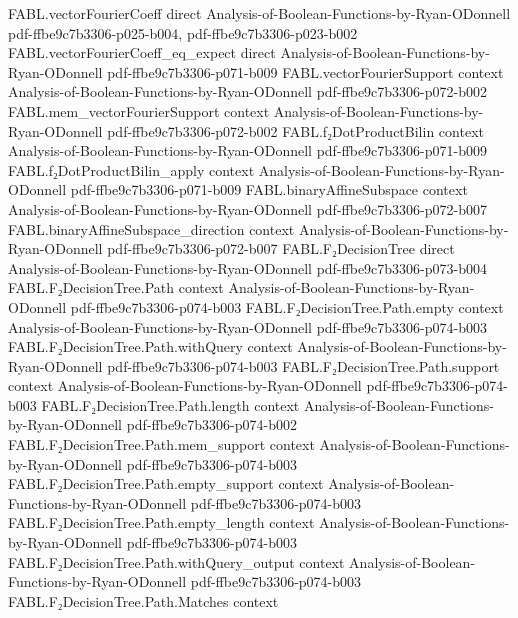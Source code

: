 \begin{theorem}
\proofstep
  {FABL.vectorFourierCoeff}
  {direct}
  {Analysis-of-Boolean-Functions-by-Ryan-ODonnell}
  {pdf-ffbe9c7b3306-p025-b004,
    pdf-ffbe9c7b3306-p023-b002}
\proofstep
  {FABL.vectorFourierCoeff_eq_expect}
  {direct}
  {Analysis-of-Boolean-Functions-by-Ryan-ODonnell}
  {pdf-ffbe9c7b3306-p071-b009}
\proofstep
  {FABL.vectorFourierSupport}
  {context}
  {Analysis-of-Boolean-Functions-by-Ryan-ODonnell}
  {pdf-ffbe9c7b3306-p072-b002}
\proofstep
  {FABL.mem_vectorFourierSupport}
  {context}
  {Analysis-of-Boolean-Functions-by-Ryan-ODonnell}
  {pdf-ffbe9c7b3306-p072-b002}
\proofstep
  {FABL.f₂DotProductBilin}
  {context}
  {Analysis-of-Boolean-Functions-by-Ryan-ODonnell}
  {pdf-ffbe9c7b3306-p071-b009}
\proofstep
  {FABL.f₂DotProductBilin_apply}
  {context}
  {Analysis-of-Boolean-Functions-by-Ryan-ODonnell}
  {pdf-ffbe9c7b3306-p071-b009}
\proofstep
  {FABL.binaryAffineSubspace}
  {context}
  {Analysis-of-Boolean-Functions-by-Ryan-ODonnell}
  {pdf-ffbe9c7b3306-p072-b007}
\proofstep
  {FABL.binaryAffineSubspace_direction}
  {context}
  {Analysis-of-Boolean-Functions-by-Ryan-ODonnell}
  {pdf-ffbe9c7b3306-p072-b007}
\proofstep
  {FABL.F₂DecisionTree}
  {direct}
  {Analysis-of-Boolean-Functions-by-Ryan-ODonnell}
  {pdf-ffbe9c7b3306-p073-b004}
\proofstep
  {FABL.F₂DecisionTree.Path}
  {context}
  {Analysis-of-Boolean-Functions-by-Ryan-ODonnell}
  {pdf-ffbe9c7b3306-p074-b003}
\proofstep
  {FABL.F₂DecisionTree.Path.empty}
  {context}
  {Analysis-of-Boolean-Functions-by-Ryan-ODonnell}
  {pdf-ffbe9c7b3306-p074-b003}
\proofstep
  {FABL.F₂DecisionTree.Path.withQuery}
  {context}
  {Analysis-of-Boolean-Functions-by-Ryan-ODonnell}
  {pdf-ffbe9c7b3306-p074-b003}
\proofstep
  {FABL.F₂DecisionTree.Path.support}
  {context}
  {Analysis-of-Boolean-Functions-by-Ryan-ODonnell}
  {pdf-ffbe9c7b3306-p074-b003}
\proofstep
  {FABL.F₂DecisionTree.Path.length}
  {context}
  {Analysis-of-Boolean-Functions-by-Ryan-ODonnell}
  {pdf-ffbe9c7b3306-p074-b002}
\proofstep
  {FABL.F₂DecisionTree.Path.mem_support}
  {context}
  {Analysis-of-Boolean-Functions-by-Ryan-ODonnell}
  {pdf-ffbe9c7b3306-p074-b003}
\proofstep
  {FABL.F₂DecisionTree.Path.empty_support}
  {context}
  {Analysis-of-Boolean-Functions-by-Ryan-ODonnell}
  {pdf-ffbe9c7b3306-p074-b003}
\proofstep
  {FABL.F₂DecisionTree.Path.empty_length}
  {context}
  {Analysis-of-Boolean-Functions-by-Ryan-ODonnell}
  {pdf-ffbe9c7b3306-p074-b003}
\proofstep
  {FABL.F₂DecisionTree.Path.withQuery_output}
  {context}
  {Analysis-of-Boolean-Functions-by-Ryan-ODonnell}
  {pdf-ffbe9c7b3306-p074-b003}
\proofstep
  {FABL.F₂DecisionTree.Path.Matches}
  {context}

\end{theorem}
